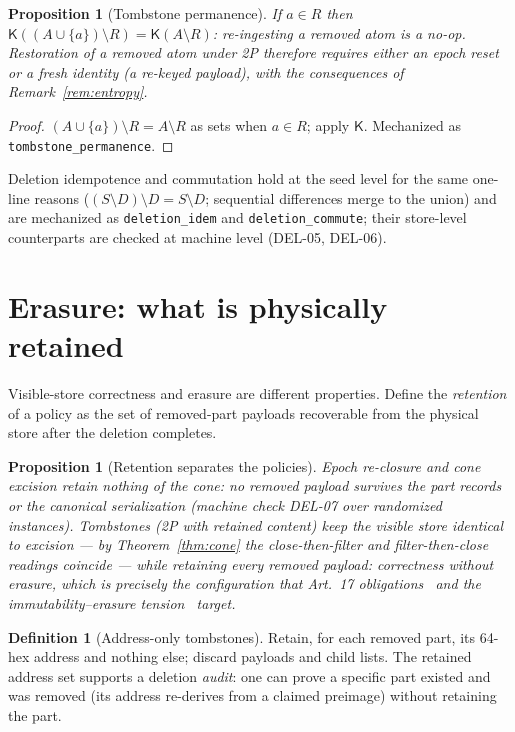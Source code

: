 \documentclass[11pt]{article}
\newtheorem{proposition}[theorem]{Proposition}
\theoremstyle{definition}
\newtheorem{definition}[theorem]{Definition}
\theoremstyle{remark}
\newcommand{\K}{\mathsf{K}}
\newcommand{\diffop}{\setminus}
\begin{document}
\begin{proposition}[Tombstone permanence]\label{prop:noreadd}
If $a \in R$ then $\K((A \cup \{a\}) \diffop R) = \K(A \diffop R)$: re-ingesting a removed atom is a no-op. Restoration of a removed atom under 2P therefore requires either an epoch reset or a fresh identity (a re-keyed payload), with the consequences of Remark~\ref{rem:entropy}.
\end{proposition}

\begin{proof}
$(A \cup \{a\}) \diffop R = A \diffop R$ as sets when $a \in R$; apply $\K$. Mechanized as \texttt{tombstone\_permanence}.
\end{proof}

Deletion idempotence and commutation hold at the seed level for the same one-line reasons ($(S\diffop D)\diffop D = S \diffop D$; sequential differences merge to the union) and are mechanized as \texttt{deletion\_idem} and \texttt{deletion\_commute}; their store-level counterparts are checked at machine level (DEL-05, DEL-06).

\section{Erasure: what is physically retained}\label{sec:erasure}

Visible-store correctness and erasure are different properties. Define the \emph{retention} of a policy as the set of removed-part payloads recoverable from the physical store after the deletion completes.

\begin{proposition}[Retention separates the policies]\label{prop:retention}
\emph{Epoch re-closure} and \emph{cone excision} retain nothing of the cone: no removed payload survives the part records or the canonical serialization (machine check DEL-07 over randomized instances). \emph{Tombstones} (2P with retained content) keep the visible store identical to excision --- by Theorem~\ref{thm:cone} the close-then-filter and filter-then-close readings coincide --- while retaining every removed payload: correctness without erasure, which is precisely the configuration that Art.~17 obligations~\cite{GDPR} and the immutability--erasure tension~\cite{Finck19} target.
\end{proposition}

\begin{definition}[Address-only tombstones]\label{def:aot}
Retain, for each removed part, its 64-hex address and nothing else; discard payloads and child lists. The retained address set supports a deletion \emph{audit}: one can prove a specific part existed and was removed (its address re-derives from a claimed preimage) without retaining the part.
\end{definition}
\end{document}
